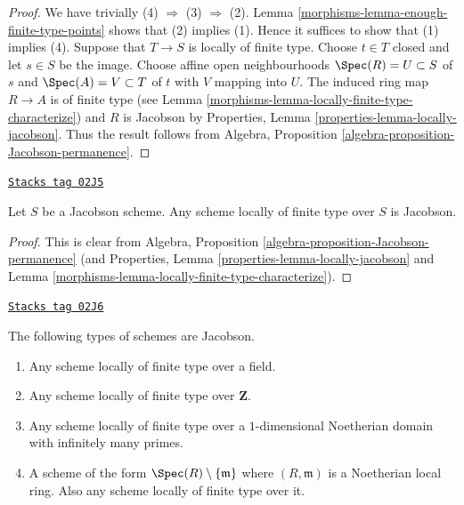 \begin{proof}

We have trivially (4) $\Rightarrow$ (3) $\Rightarrow$ (2).
Lemma \ref{morphisms-lemma-enough-finite-type-points} shows that (2) implies (1).
Hence it suffices to show that (1) implies (4).
Suppose that $T \to S$ is locally of finite type.
Choose $t \in T$ closed and let $s \in S$ be the image.
Choose affine open neighbourhoods $\Spec(R) = U \subset S$ of $s$ and
$\Spec(A) = V \subset T$ of $t$ with $V$ mapping into $U$.
The induced ring map $R \to A$ is of finite type
(see Lemma \ref{morphisms-lemma-locally-finite-type-characterize}) and $R$ is Jacobson
by Properties, Lemma \ref{properties-lemma-locally-jacobson}.
Thus the result follows from
Algebra, Proposition \ref{algebra-proposition-Jacobson-permanence}.
\end{proof}

\begin{lemma}
\label{morphisms-lemma-Jacobson-universally-Jacobson}
\href{https://stacks.math.columbia.edu/tag/02J5}{\texttt{Stacks tag 02J5}}

Let $S$ be a Jacobson scheme.
Any scheme locally of finite type over $S$ is Jacobson.
\end{lemma}

\begin{proof}

This is clear from
Algebra, Proposition \ref{algebra-proposition-Jacobson-permanence}
(and Properties, Lemma \ref{properties-lemma-locally-jacobson} and
Lemma \ref{morphisms-lemma-locally-finite-type-characterize}).
\end{proof}

\begin{lemma}
\label{morphisms-lemma-ubiquity-Jacobson-schemes}
\href{https://stacks.math.columbia.edu/tag/02J6}{\texttt{Stacks tag 02J6}}

The following types of schemes are Jacobson.
\begin{enumerate}
\item Any scheme locally of finite type over a field.
\item Any scheme locally of finite type over $\mathbf{Z}$.
\item Any scheme locally of finite type over a $1$-dimensional
Noetherian domain with infinitely many primes.
\item A scheme of the form $\Spec(R) \setminus \{\mathfrak m\}$
where $(R, \mathfrak m)$ is a Noetherian local ring.
Also any scheme locally of finite type over it.
\end{enumerate}
\end{lemma}

